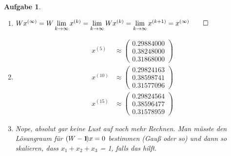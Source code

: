 \documentclass[11pt]{article}
\theoremstyle{break}
\newtheorem{task}{Aufgabe}
\def\1{\ensuremath{{\normalfont\hbox{1\kern-0.18em \vrule width .6pt}}}}
\begin{document}
\begin{task}
\begin{enumerate}[label={(\alph*)}]
        \item $W x^{(\infty)} = W \lim\limits_{k\rightarrow\infty} x^{(k)} = \lim\limits_{k\rightarrow\infty} W x^{(k)} = \lim\limits_{k\rightarrow\infty} x^{(k+1)} = x^{(\infty)}\hfill\qed$
        \item \hfill\vspace{-5mm}
        \begin{align*}
            x^{(5)} &\approx \begin{pmatrix}
                0.29884000\\
                0.38248000\\
                0.31868000
            \end{pmatrix}\\
            x^{(10)} &\approx \begin{pmatrix}
                0.29824163\\
                0.38598741\\
                0.31577096
            \end{pmatrix}\\
            x^{(15)} &\approx \begin{pmatrix}
                0.29824564\\
                0.38596477\\
                0.31578959
            \end{pmatrix}
        \end{align*}
        \item Nope, absolut gar keine Lust auf noch mehr Rechnen. Man müsste den Lösungraum für $(W-\1)x=0$ bestimmen (Gauß oder so) und dann so skalieren, dass $x_1 + x_2 + x_3$ = 1, falls das hilft.
    \end{enumerate}
\end{task}
\end{document}
